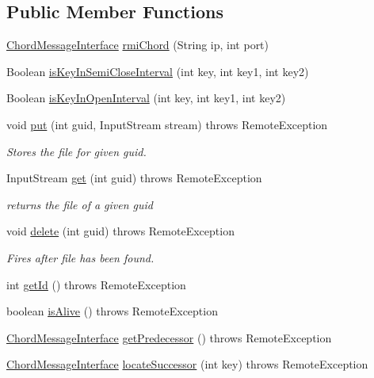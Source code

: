 \subsection*{Public Member Functions}
\begin{DoxyCompactItemize}
\item 
\hyperlink{interface_chord_message_interface}{Chord\+Message\+Interface} \hyperlink{class_chord_a2fd46745a549fb8447f2cb7e32e8b07b}{rmi\+Chord} (String ip, int port)
\item 
Boolean \hyperlink{class_chord_ad88edc3a01395c31dd0ae209195a2e08}{is\+Key\+In\+Semi\+Close\+Interval} (int key, int key1, int key2)
\item 
Boolean \hyperlink{class_chord_a711a8c4e621940da4c48c1ba60479bd7}{is\+Key\+In\+Open\+Interval} (int key, int key1, int key2)
\item 
void \hyperlink{class_chord_a1133387e1312ead8daf5c94c11ff3b78}{put} (int guid, Input\+Stream stream)  throws Remote\+Exception
\begin{DoxyCompactList}\small\item\em Stores the file for given guid. \end{DoxyCompactList}\item 
Input\+Stream \hyperlink{class_chord_a6fa6e161d33e337f53cc0f3e38e1791b}{get} (int guid)  throws Remote\+Exception 
\begin{DoxyCompactList}\small\item\em returns the file of a given guid \end{DoxyCompactList}\item 
void \hyperlink{class_chord_ab16ffb81226d722399a46d1acfd70e60}{delete} (int guid)  throws Remote\+Exception 
\begin{DoxyCompactList}\small\item\em Fires after file has been found. \end{DoxyCompactList}\item 
int \hyperlink{class_chord_a7c6a50aff653bafc040f923c93061bdb}{get\+Id} ()  throws Remote\+Exception 
\item 
boolean \hyperlink{class_chord_a0a677ced19cc0cb5afd2a695977aeb95}{is\+Alive} ()  throws Remote\+Exception 
\item 
\hyperlink{interface_chord_message_interface}{Chord\+Message\+Interface} \hyperlink{class_chord_a3f1aadce3820e808c80662bb61a58e34}{get\+Predecessor} ()  throws Remote\+Exception
\item 
\hyperlink{interface_chord_message_interface}{Chord\+Message\+Interface} \hyperlink{class_chord_aa53f4f7c97122395a33d064460538db0}{locate\+Successor} (int key)  throws Remote\+Exception

\end{DoxyCompactItemize}
